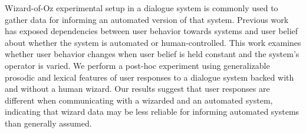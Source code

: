 Wizard-of-Oz experimental setup in a dialogue system is commonly used to gather data for informing an automated version of that system. Previous work has
 exposed dependencies between user behavior towards systems and user belief
 about whether the system is automated or human-controlled. This work examines
 whether user behavior changes when user belief is held constant and the
 system's operator is varied. We perform a post-hoc experiment using
 generalizable prosodic and lexical features of user responses to a dialogue
 system backed with and without a human wizard. Our results suggest that user
 responses are different when communicating with a wizarded and an automated
 system, indicating that wizard data may be less reliable for informing
 automated systems than generally assumed.

